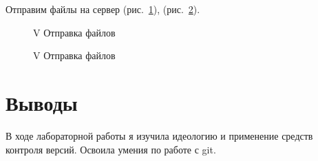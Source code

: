 \documentclass[
  english,
  russian,
  12pt,
  a4paper,
  DIV=11,
  numbers=noendperiod]{scrreprt}
\begin{document}
Отправим файлы на сервер (рис.~\ref{fig-014}), (рис.~\ref{fig-015}).

\begin{figure}


\caption{\label{fig-014}V Отправка файлов}

\end{figure}%

\begin{figure}


\caption{\label{fig-015}V Отправка файлов}

\end{figure}%

\chapter{Выводы}\label{ux432ux44bux432ux43eux434ux44b}

В ходе лабораторной работы я изучила идеологию и применение средств
контроля версий. Освоила умения по работе с git.


\printbibliography
\end{document}
